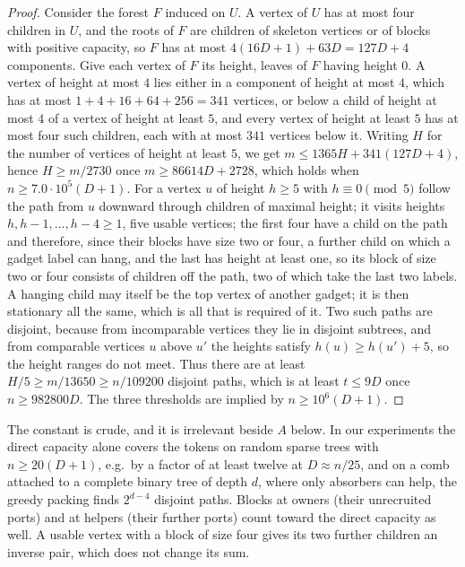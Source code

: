 \documentclass[11pt,a4paper]{article}
\theoremstyle{plain}
\theoremstyle{definition}
\theoremstyle{remark}
\begin{document}
\begin{proof}
Consider the forest $F$ induced on $U$.  A vertex of $U$ has at most four
children in $U$, and the roots of $F$ are children of skeleton vertices or of
blocks with positive capacity, so $F$ has at most $4(16D+1)+63D=127D+4$
components.  Give
each vertex of $F$ its height, leaves of $F$ having height $0$.  A vertex of
height at most $4$ lies either in a component of height at most $4$, which
has at most $1+4+16+64+256=341$ vertices, or below a child of height at most
$4$ of a vertex of height at least $5$, and every vertex of height at least
$5$ has at most four such children, each with at most $341$ vertices below
it.  Writing $H$ for the number of vertices of height at least $5$, we get
$m\le 1365H+341(127D+4)$, hence $H\ge m/2730$ once $m\ge 86614D+2728$, which
holds when $n\ge 7.0\cdot 10^5(D+1)$.  For a vertex $u$ of height $h\ge 5$ with
$h\equiv 0\pmod 5$ follow the path from $u$ downward through children of
maximal height; it visits heights $h,h-1,\dots,h-4\ge 1$, five usable
vertices; the first four have a child on the path and therefore, since their
blocks have size two or four, a further child on which a gadget label can
hang, and the last has height at least one, so its block of size two or four
consists of children off the path, two of which take the last two labels.  A
hanging child may itself be the top vertex of another gadget; it is then
stationary all the same, which is all that is required of it.  Two such paths are disjoint, because
from incomparable vertices they lie in disjoint subtrees, and from comparable
vertices $u$ above $u'$ the heights satisfy $h(u)\ge h(u')+5$, so the height
ranges do not meet.  Thus there are at least $H/5\ge m/13650\ge n/109200$
disjoint paths, which is at least $t\le 9D$ once $n\ge 982800D$.  The three
thresholds are implied by $n\ge 10^6(D+1)$.
\end{proof}

The constant is crude, and it is irrelevant beside $A$ below.  In our
experiments the direct capacity alone covers the tokens on random sparse trees
with $n\ge 20(D+1)$, e.g.\ by a factor of at least twelve at $D\approx n/25$,
and on a comb attached to a complete binary tree of depth $d$, where only
absorbers can help, the greedy packing finds $2^{d-4}$ disjoint paths.  Blocks at owners (their unrecruited ports) and at helpers (their
further ports) count toward the direct capacity as well.  A usable vertex with
a block of size four gives its two further children an inverse pair, which
does not change its sum.
\end{document}
